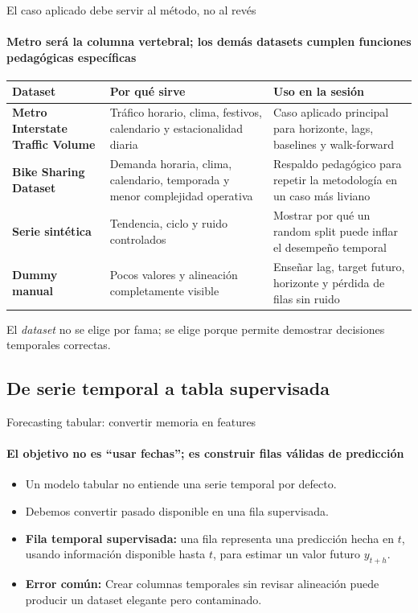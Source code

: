\documentclass[aspectratio=169,11pt]{beamer}  %
\newcommand{\hrow}{\rowcolor{mlcream}}
\newcommand{\Lg}{\fontsize{16}{20}\selectfont}
\begin{document}
\begin{frame}{El caso aplicado debe servir al método, no al revés}
\framesubtitle{Metro será la columna vertebral; los demás datasets cumplen funciones pedagógicas específicas}
\centering\footnotesize
\begin{tabular}{@{}P{0.27\textwidth} P{0.36\textwidth} P{0.30\textwidth}@{}}
\toprule
\hrow \textbf{Dataset} & Por qué sirve & Uso en la sesión\\
\midrule
\textbf{Metro Interstate Traffic Volume} & Tráfico horario, clima, festivos, calendario y estacionalidad diaria & Caso aplicado principal para horizonte, lags, baselines y walk-forward\\
\textbf{Bike Sharing Dataset} & Demanda horaria, clima, calendario, temporada y menor complejidad operativa & Respaldo pedagógico para repetir la metodología en un caso más liviano\\
\textbf{Serie sintética} & Tendencia, ciclo y ruido controlados & Mostrar por qué un random split puede inflar el desempeño temporal\\
\textbf{Dummy manual} & Pocos valores y alineación completamente visible & Enseñar lag, target futuro, horizonte y pérdida de filas sin ruido\\
\bottomrule
\end{tabular}

{\small El \emph{dataset} no se elige por fama; se elige porque permite demostrar decisiones temporales correctas.\par}
\end{frame}

\subsection{De serie temporal a tabla supervisada}

\begin{frame}{Forecasting tabular: convertir memoria en features}
\framesubtitle{El objetivo no es ``usar fechas''; es construir filas válidas de predicción}
\Lg
\begin{itemize}
\item Un modelo tabular no entiende una serie temporal por defecto.
\item Debemos convertir pasado disponible en una fila supervisada.
\item \textbf{Fila temporal supervisada:} una fila representa una predicción hecha en $t$, usando información disponible hasta $t$, para estimar un valor futuro $y_{t+h}$.
\item \textbf{Error común:} Crear columnas temporales sin revisar alineación puede producir un dataset elegante pero contaminado.
\end{itemize}
\end{frame}
\end{document}
